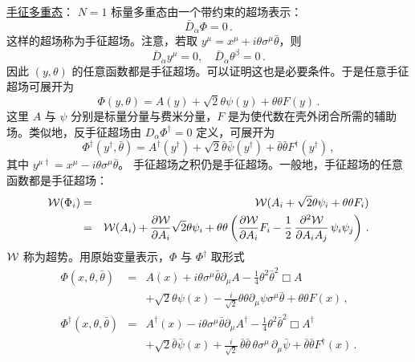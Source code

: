 \noindent\underline{手征多重态}：
\noindent $N=1$ 标量多重态由一个带约束的超场表示：
$$
\bar{D}_{\dot{\alpha}} \Phi = 0 \,.
$$
这样的超场称为手征超场。注意，若取
$y^\mu = x^\mu +i\theta\sigma^\mu\bar{\theta}$，则
$$
\bar{D}_{\dot\alpha}y^\mu=0,\quad\bar{D}_{\dot\alpha}\theta^\beta=0\,.
$$
因此 $(y,\theta)$ 的任意函数都是手征超场。可以证明这也是必要条件。于是任意手征超场可展开为
\begin{equation}
\Phi(y,\theta)=A(y)+\sqrt{2}\theta\psi(y)+\theta\theta F(y)\,.
\label{csfy}
\end{equation}
这里 $A$ 与 $\psi$ 分别是标量分量与费米分量，$F$ 是为使代数在壳外闭合所需的辅助场。类似地，反手征超场由 $D_{\alpha}\Phi^\dagger=0$ 定义，可展开为
\begin{equation}
\Phi^\dagger(y^\dagger,\bar\theta) =A^\dagger(y^\dagger)+\sqrt{2}
\bar{\theta}\bar{\psi}(y^\dagger)+\bar{\theta}\bar{\theta} 
F^\dagger(y^\dagger)\,,
\label{acsfy}
\end{equation}
其中 $y^{\mu\dagger}=x^\mu-i\theta\sigma^\mu\bar{\theta}$。
手征超场之积仍是手征超场。一般地，手征超场的任意函数都是手征超场：
\begin{eqnarray}
{\cal W}(\Phi_{i}) &=& {\cal W}(A_{i} + \sqrt{2} \theta \psi_{i} +
\theta \theta F_{i} ) \nonumber \\
&=&{\cal W}(A_{i}) + \frac{\partial {\cal W}}{\partial A_{i}}
\sqrt{2} \theta \psi_{i} + \theta \theta \left (\frac{\partial 
{\cal W}}{\partial A_{i}} F_{i} - \frac{1}{2} \, \frac{\partial^{2}
{\cal W}}{\partial A_i A_j}\, \psi_{i} \psi_{j} \right)\,.
\label{spotential}
\end{eqnarray}
${\cal W}$ 称为超势。用原始变量表示，$\Phi$ 与 $\Phi^\dagger$ 取形式
\begin{eqnarray}
\Phi(x,\theta,\bar\theta) &=& A(x)+i\theta\sigma^\mu \bar{\theta}
\partial_\mu A-\frac{1}{4}\theta^2 \bar{\theta}^2 \Box A 
\nonumber\\
&&+\sqrt{2}\theta\psi(x)-\frac{i}{\sqrt{2}}\theta\theta
\partial_\mu\psi\sigma^\mu\bar{\theta} +\theta \theta F(x)\,,
\label{csfield}
\\
\Phi^\dagger(x,\theta,\bar\theta)&=&A^\dagger(x)-i\theta\sigma^\mu
\bar{\theta} \partial_\mu A^\dagger - \frac{1}{4} \theta^{2}
\bar{\theta}^{2} \Box A^\dagger \nonumber\\
&&+\sqrt{2} \bar{\theta} \bar{\psi} (x) + \frac{i}{\sqrt{2}} \,
\bar{\theta} \bar{\theta} \, \theta \sigma^\mu \, \partial_\mu
\bar{\psi} + \bar{\theta} \bar{\theta} F^\dagger (x)\,.
\label{asfield}
\end{eqnarray}

